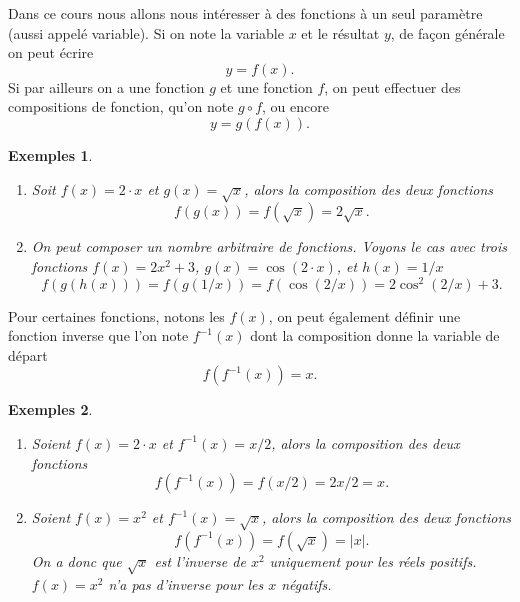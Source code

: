 \documentclass[a4paper,12pt]{book}
\newtheorem*{exemples}{Exemples}
\begin{document}
Dans ce cours nous allons nous intéresser à des fonctions à un seul paramètre (aussi appelé variable). Si on note la variable $x$ et le résultat $y$, de façon générale on peut écrire 
\begin{equation}
y = f(x).
\end{equation}
Si par ailleurs on a une fonction $g$ et une fonction $f$, on peut effectuer des compositions de fonction, qu'on note $g\circ f$, ou encore 
\begin{equation}
y=g(f(x)).
\end{equation}
\begin{exemples}\hfill\break

\begin{enumerate}
\item Soit $f(x)=2\cdot x$ et $g(x)=\sqrt{x}$, alors la composition des deux fonctions
\begin{equation}
f(g(x))=f(\sqrt{x})=2\sqrt{x}.
\end{equation}
\item On peut composer un nombre arbitraire de fonctions. Voyons le cas avec trois fonctions
$f(x)=2x^2+3$, $g(x)=\cos(2\cdot x)$, et $h(x)=1/x$
\begin{equation}
f(g(h(x)))=f(g(1/x))=f(\cos(2/x))=2\cos^2(2/x)+3.
\end{equation}
\end{enumerate}
\end{exemples}

Pour certaines fonctions, notons les $f(x)$, on peut également définir une fonction inverse
que l'on note $f^{-1}(x)$ dont la composition donne la variable de départ
\begin{equation}
f(f^{-1}(x))=x.
\end{equation}
\begin{exemples}\hfill\break

\begin{enumerate}
\item Soient $f(x)=2\cdot x$ et $f^{-1}(x)=x/2$, alors la composition des deux fonctions
\begin{equation}
f(f^{-1}(x))=f(x/2)=2x/2=x.
\end{equation}
\item Soient $f(x)=x^2$ et $f^{-1}(x)=\sqrt{x}$, alors la composition des deux fonctions
\begin{equation}
f(f^{-1}(x))=f(\sqrt{x})=|x|.
\end{equation}
On a donc que $\sqrt{x}$ est l'inverse de $x^2$ uniquement pour les réels positifs. $f(x)=x^2$ n'a pas d'inverse pour les $x$ négatifs.
\end{enumerate}
\end{exemples}
\end{document}
